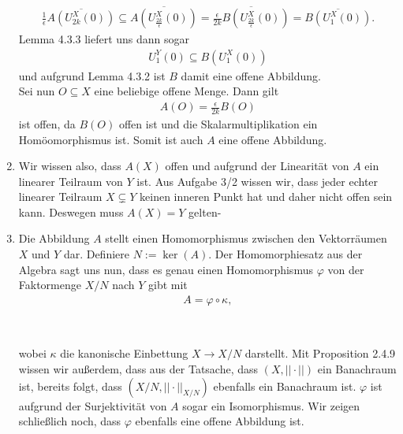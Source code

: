 \begin{solution}
\begin{enumerate}[label = (\roman*)]
\begin{align*}
    \frac{1}{\epsilon} \overline{A(U_{2k}^X(0))}
    \subseteq \overline{A(U_{\frac{2k}{\epsilon}}^X(0))}
    = \overline{\frac{\epsilon}{2k}B(U_{\frac{2k}{\epsilon}}^X(0))}
    = \overline{B(U_{1}^X(0))}.
  \end{align*}
  Lemma 4.3.3 liefert uns dann sogar
  \begin{align*}
    U_1^Y(0) \subseteq B(U_{1}^X(0))
  \end{align*}
  und aufgrund Lemma 4.3.2 ist $B$ damit eine offene Abbildung. \\
  Sei nun $O \subseteq X$ eine beliebige offene Menge. Dann gilt
  \begin{align*}
    A(O) = \frac{\epsilon}{2k}B(O)
  \end{align*}
  ist offen, da $B(O)$ offen ist und die Skalarmultiplikation ein Homöomorphismus ist.
  Somit ist auch $A$ eine offene Abbildung.
  \item Wir wissen also, dass $A(X)$ offen und aufgrund der Linearität von $A$
  ein linearer Teilraum von $Y$ ist. Aus Aufgabe 3/2 wissen wir, dass
  jeder echter linearer Teilraum $X \subsetneq Y$ keinen inneren Punkt hat und
  daher nicht offen sein kann. Deswegen muss $A(X) = Y$ gelten-
  \item Die Abbildung $A$ stellt einen Homomorphismus zwischen den Vektorräumen
  $X$ und $Y$ dar. Definiere $N := \ker(A)$. Der Homomorphiesatz aus der Algebra
  sagt uns nun, dass es genau einen Homomorphismus $\varphi$ von der Faktormenge $X/N$
  nach $Y$ gibt mit
  \begin{align*}
    A = \varphi \circ \kappa,
  \end{align*}
  \begin{center}
   \\
  \end{center}
  wobei $\kappa$ die kanonische Einbettung $X \rightarrow X/N$ darstellt.
  Mit Proposition 2.4.9 wissen wir außerdem, dass aus der Tatsache, dass $(X,||\cdot||)$
  ein Banachraum ist, bereits folgt, dass $(X/N, ||\cdot||_{X/N})$ ebenfalls ein
  Banachraum ist. $\varphi$ ist aufgrund der Surjektivität von $A$ sogar ein
  Isomorphismus. Wir zeigen schließlich noch, dass $\varphi$ ebenfalls eine offene Abbildung ist.

\end{enumerate}
\end{solution}
